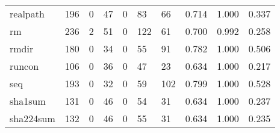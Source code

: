 \begin{longtable}{lp{1.3cm}p{1.3cm}p{1.3cm}p{1.3cm}p{1.3cm}p{1.3cm}p{1.3cm}p{1.3cm}p{1.3cm}}
realpath  &                    196 &                                  0 &                                47 &                                0 &                                83 &                              66 &                                0.714 &                                  1.000 &                                0.337 \\
rm        &                    236 &                                  2 &                                51 &                                0 &                               122 &                              61 &                                0.700 &                                  0.992 &                                0.258 \\
rmdir     &                    180 &                                  0 &                                34 &                                0 &                                55 &                              91 &                                0.782 &                                  1.000 &                                0.506 \\
runcon    &                    106 &                                  0 &                                36 &                                0 &                                47 &                              23 &                                0.634 &                                  1.000 &                                0.217 \\
seq       &                    193 &                                  0 &                                32 &                                0 &                                59 &                             102 &                                0.799 &                                  1.000 &                                0.528 \\
sha1sum   &                    131 &                                  0 &                                46 &                                0 &                                54 &                              31 &                                0.634 &                                  1.000 &                                0.237 \\
sha224sum &                    132 &                                  0 &                                46 &                                0 &                                55 &                              31 &                                0.634 &                                  1.000 &                                0.235 \\

\end{longtable}
